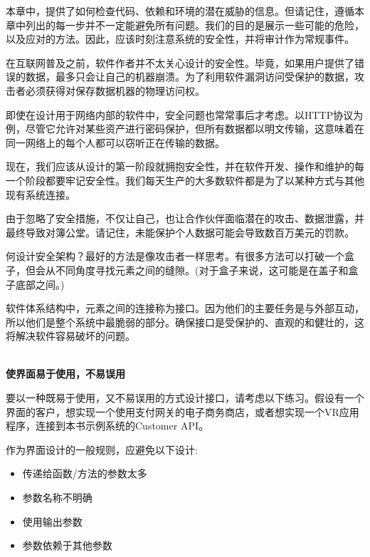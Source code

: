 
本章中，提供了如何检查代码、依赖和环境的潜在威胁的信息。但请记住，遵循本章中列出的每一步并不一定能避免所有问题。我们的目的是展示一些可能的危险，以及应对的方法。因此，应该时刻注意系统的安全性，并将审计作为常规事件。

在互联网普及之前，软件作者并不太关心设计的安全性。毕竟，如果用户提供了错误的数据，最多只会让自己的机器崩溃。为了利用软件漏洞访问受保护的数据，攻击者必须获得对保存数据机器的物理访问权。

即使在设计用于网络内部的软件中，安全问题也常常事后才考虑。以HTTP协议为例，尽管它允许对某些资产进行密码保护，但所有数据都以明文传输，这意味着在同一网络上的每个人都可以窃听正在传输的数据。

现在，我们应该从设计的第一阶段就拥抱安全性，并在软件开发、操作和维护的每一个阶段都要牢记安全性。我们每天生产的大多数软件都是为了以某种方式与其他现有系统连接。

由于忽略了安全措施，不仅让自己，也让合作伙伴面临潜在的攻击、数据泄露，并最终导致对簿公堂。请记住，未能保护个人数据可能会导致数百万美元的罚款。


何设计安全架构？最好的方法是像攻击者一样思考。有很多方法可以打破一个盒子，但会从不同角度寻找元素之间的缝隙。(对于盒子来说，这可能是在盖子和盒子底部之间。)

软件体系结构中，元素之间的连接称为接口。因为他们的主要任务是与外部互动，所以他们是整个系统中最脆弱的部分。确保接口是受保护的、直观的和健壮的，这将解决软件容易破坏的问题。

\hspace*{\fill} \\ %
\noindent
\textbf{使界面易于使用，不易误用}

要以一种既易于使用，又不易误用的方式设计接口，请考虑以下练习。假设有一个界面的客户，想实现一个使用支付网关的电子商务商店，或者想实现一个VR应用程序，连接到本书示例系统的Customer API。

作为界面设计的一般规则，应避免以下设计:

\begin{itemize}
\item 
传递给函数/方法的参数太多

\item 
参数名称不明确

\item 
使用输出参数

\item 
参数依赖于其他参数
\end{itemize}

